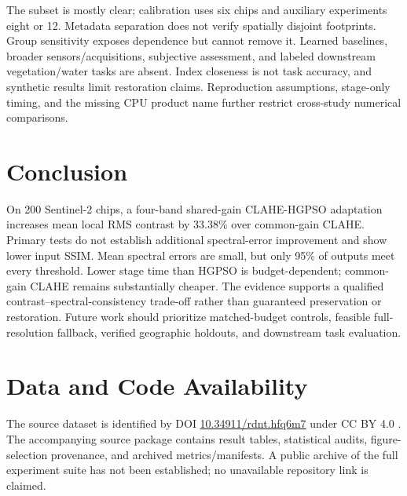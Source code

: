 \documentclass[conference]{IEEEtran}
\begin{document}
The subset is mostly clear; calibration uses six chips and auxiliary experiments eight or 12. Metadata separation does not verify spatially disjoint footprints. Group sensitivity exposes dependence but cannot remove it. Learned baselines, broader sensors/acquisitions, subjective assessment, and labeled downstream vegetation/water tasks are absent. Index closeness is not task accuracy, and synthetic results limit restoration claims. Reproduction assumptions, stage-only timing, and the missing CPU product name further restrict cross-study numerical comparisons.

\section{Conclusion}
\label{sec:conclusion}
On 200 Sentinel-2 chips, a four-band shared-gain CLAHE-HGPSO adaptation increases mean local RMS contrast by 33.38\% over common-gain CLAHE. Primary tests do not establish additional spectral-error improvement and show lower input SSIM. Mean spectral errors are small, but only 95\% of outputs meet every threshold. Lower stage time than HGPSO is budget-dependent; common-gain CLAHE remains substantially cheaper. The evidence supports a qualified contrast--spectral-consistency trade-off rather than guaranteed preservation or restoration. Future work should prioritize matched-budget controls, feasible full-resolution fallback, verified geographic holdouts, and downstream task evaluation.

\section*{Data and Code Availability}
The source dataset is identified by DOI \url{10.34911/rdnt.hfq6m7} under CC BY 4.0 \cite{radiant2022}. The accompanying source package contains result tables, statistical audits, figure-selection provenance, and archived metrics/manifests. A public archive of the full experiment suite has not been established; no unavailable repository link is claimed.



\end{document}
